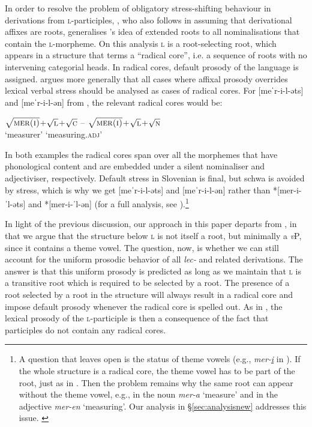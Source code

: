 \documentclass[output=paper,colorlinks,citecolor=brown]{langscibook}
\begin{document}
In order to resolve the problem of obligatory stress-shifting behaviour in derivations from \textsc{l}-participles, \citet{Simonovic2020}, who also follows \citet[]{lowenstamm2014} in assuming that derivational affixes are roots, generalises \citeauthor{marvin2002}'s idea of extended roots to all nominalisations that contain the \textsc{l}-morpheme. On this analysis \textsc{l} is a root-selecting root, which appears in a structure that \citet[]{lowenstamm2014} terms a ``radical core'', i.e. a sequence of roots with no intervening categorial heads. In radical cores, default prosody of the language is assigned. \citet{Simonovic2020} argues more generally that all cases where affixal prosody overrides lexical verbal stress should be analysed as cases of radical cores. For  [{meˈr-i-l-əts}] and [{meˈr-i-l-ən}] from , the relevant radical cores would be:

\ea \label{ex:brusroots}
\gll $\sqrt\textsc{mer(i)}$+$\sqrt\textsc{l}$+$\sqrt\textsc{c}$ --  $\sqrt\textsc{mer(i)}$+$\sqrt\textsc{l}$+$\sqrt\textsc{n}$ \\
`measurer' {} `measuring.\textsc{adj}' \\
\z 



\noindent In both examples the radical cores span over all the morphemes that have phonological content and are embedded under a silent nominaliser and adjectiviser, respectively. Default stress in Slovenian is final, but schwa is avoided by stress, which is why we get [{meˈr-i-l-əts}] and [{meˈr-i-l-ən}] rather than *[{mer-i-ˈl-əts}] and *[{mer-i-ˈl-ən}] (for a full analysis, see \citealt{simonovic2025}).\footnote{A question that \citet{Simonovic2020} leaves open is the status of theme vowels (e.g., \textit{mer-\underline{i}} in ). If the whole structure is a radical core, the theme vowel has to be part of the root, just as in \citet[]{marvin2002}. Then the problem remains why the same root can appear without the theme vowel, e.g., in the noun \textit{mer-a} `measure' and in the adjective \textit{mer-en} `measuring'. Our analysis in \S \ref{sec:analysisnew} addresses this issue. \label{fn:markoproblem}} 


In light of the previous discussion, our approach in this paper departs from \citet{Simonovic2020}, in that we argue that the structure below \textsc{l} is not itself a root, but minimally a \textit{v}P, since it contains a theme vowel. The question, now, is whether we can still account for the uniform prosodic behavior of all \textit{lec-} and related derivations. The answer is that this uniform prosody is predicted as long as we maintain that \textsc{l} is a transitive root which is required to be selected by a root. The presence of a root selected by a root in the structure will always result in a radical core and impose default prosody whenever the radical core is spelled out. As in \citet{Simonovic2020}, the lexical prosody of the \textsc{l}-participle is then a consequence of the fact that participles do not contain any radical cores. 
\end{document}
